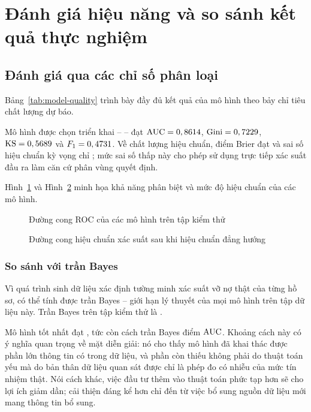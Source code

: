 \section{Đánh giá hiệu năng và so sánh kết quả thực nghiệm}
\label{sec:danh-gia-hieu-nang}

\subsection{Đánh giá qua các chỉ số phân loại}
\label{subsec:kq-chi-so-phan-loai}

Bảng~\ref{tab:model-quality} trình bày đầy đủ kết quả của \NModels{} mô hình theo
bảy chỉ tiêu chất lượng dự báo.



Mô hình được chọn triển khai -- \BestModel{} -- đạt $\mathrm{AUC} = 0,8614{}$,
$\text{Gini} = 0,7229{}$, $\mathrm{KS} = 0,5689{}$ và $F_1 = 0,4731{}$. Về chất
lượng hiệu chuẩn, điểm Brier đạt \BestBrier{} và sai số hiệu chuẩn kỳ vọng chỉ
\BestECE{}; mức sai số thấp này cho phép sử dụng trực tiếp xác suất đầu ra làm
căn cứ phân vùng quyết định.

Hình~\ref{fig:roc-curves} và Hình~\ref{fig:calibration} minh họa khả năng phân
biệt và mức độ hiệu chuẩn của các mô hình.

\begin{figure}[!htbp]
\centering
{}
\caption{Đường cong ROC của các mô hình trên tập kiểm thử}
\label{fig:roc-curves}
\end{figure}

\begin{figure}[!htbp]
\centering
{}
\caption{Đường cong hiệu chuẩn xác suất sau khi hiệu chuẩn đẳng hướng}
\label{fig:calibration}
\end{figure}

\subsubsection{So sánh với trần Bayes}

Vì quá trình sinh dữ liệu xác định tường minh xác suất vỡ nợ thật của từng hồ sơ,
có thể tính được trần Bayes -- giới hạn lý thuyết của mọi mô hình trên tập dữ
liệu này. Trần Bayes trên tập kiểm thử là \BayesAUC{}.

Mô hình tốt nhất đạt \BestAUC{}, tức còn cách trần Bayes \GapBayes{} điểm
$\mathrm{AUC}$. Khoảng cách này có ý nghĩa quan trọng về mặt diễn giải: nó cho thấy mô
hình đã khai thác được phần lớn thông tin có trong dữ liệu, và phần còn thiếu
không phải do thuật toán yếu mà do bản thân dữ liệu quan sát được chỉ là phép đo
có nhiễu của mức tín nhiệm thật. Nói cách khác, việc đầu tư thêm vào thuật toán
phức tạp hơn sẽ cho lợi ích giảm dần; cải thiện đáng kể hơn chỉ đến từ việc bổ
sung nguồn dữ liệu mới mang thông tin bổ sung.

